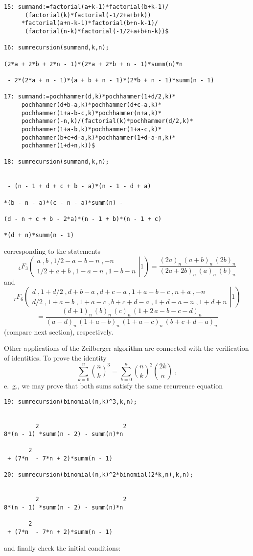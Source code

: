 {\small
\begin{verbatim}
15: summand:=factorial(a+k-1)*factorial(b+k-1)/
      (factorial(k)*factorial(-1/2+a+b+k))
     *factorial(a+n-k-1)*factorial(b+n-k-1)/
      (factorial(n-k)*factorial(-1/2+a+b+n-k))$

16: sumrecursion(summand,k,n);

(2*a + 2*b + 2*n - 1)*(2*a + 2*b + n - 1)*summ(n)*n

 - 2*(2*a + n - 1)*(a + b + n - 1)*(2*b + n - 1)*summ(n - 1)

17: summand:=pochhammer(d,k)*pochhammer(1+d/2,k)*
     pochhammer(d+b-a,k)*pochhammer(d+c-a,k)*
     pochhammer(1+a-b-c,k)*pochhammer(n+a,k)*
     pochhammer(-n,k)/(factorial(k)*pochhammer(d/2,k)*
     pochhammer(1+a-b,k)*pochhammer(1+a-c,k)*
     pochhammer(b+c+d-a,k)*pochhammer(1+d-a-n,k)*
     pochhammer(1+d+n,k))$

18: sumrecursion(summand,k,n);


 - (n - 1 + d + c + b - a)*(n - 1 - d + a)

*(b - n - a)*(c - n - a)*summ(n) - 

(d - n + c + b - 2*a)*(n - 1 + b)*(n - 1 + c)

*(d + n)*summ(n - 1)
\end{verbatim}
}\noindent
corresponding to the statements
\[
_4 F_3\left.
\left(
\begin{array}{c}
a\;, b\;, 1/2-a-b-n\;, -n\\[1mm]
1/2+a+b \;, 1-a-n\;, 1-b-n
\end{array}
\right| 1\right)
=\frac{(2a)_n\,(a+b)_n\,(2b)_n}
{(2a+2b)_n\,(a)_n\,(b)_n}
\]
and
\[
_7 F_6\left.
\left(
\begin{array}{c}
d\;, 1+d/2\;, d+b-a\;, d+c-a\;, 1+a-b-c\;, n+a\;, -n\\[1mm]
d/2\;, 1+a-b\;, 1+a-c\;, b+c+d-a \;, 1+d-a-n\;, 1+d+n
\end{array}
\right| 1\right)
\]
\[
=\frac{(d+1)_n\,(b)_n\,(c)_n\,(1+2\,a-b-c-d)_n}
{(a-d)_n\,(1+a-b)_n\,(1+a-c)_n\,(b+c+d-a)_n}
\]
(compare next section), respectively.

Other applications of the Zeilberger algorithm are connected with
the verification of identities. To prove the identity
\[
\sum_{k=0}^n
\binom{n}{k}^3
=
\sum_{k=0}^n
\binom{n}{k}^2 \binom{2k}{n}
\;,
\]
e.\ g., we may prove that both sums satisfy the same recurrence equation

{\small
\begin{verbatim}
19: sumrecursion(binomial(n,k)^3,k,n);


         2                        2
8*(n - 1) *summ(n - 2) - summ(n)*n

       2
 + (7*n  - 7*n + 2)*summ(n - 1)

20: sumrecursion(binomial(n,k)^2*binomial(2*k,n),k,n);


         2                        2
8*(n - 1) *summ(n - 2) - summ(n)*n

       2
 + (7*n  - 7*n + 2)*summ(n - 1)

\end{verbatim}
}\noindent
and finally check the initial conditions:

